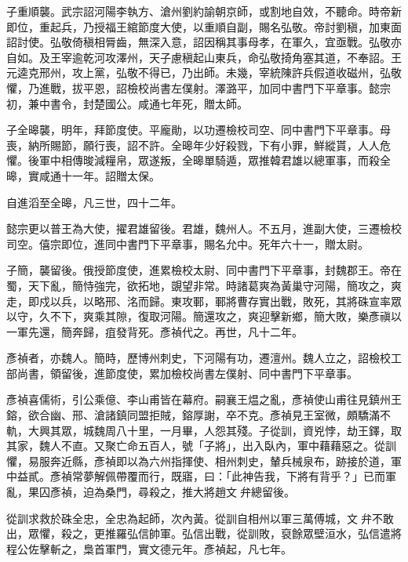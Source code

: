 \begin{pinyinscope}
 子重順襲。武宗詔河陽李執方、滄州劉約諭朝京師，或割地自效，不聽命。時帝新即位，重起兵，乃授福王綰節度大使，以重順自副，賜名弘敬。帝討劉稹，加東面詔討使。弘敬倚稹相脣齒，無深入意，詔因稱其事母孝，在軍久，宜亟戰。弘敬亦自如。及王宰逾乾河攻澤州，天子慮稹起山東兵，命弘敬掎角塞其道，不奉詔。王元逵克邢州，攻上黨，弘敬不得已，乃出師。未幾，宰統陳許兵假道收磁州，弘敬懼，乃進戰，拔平恩，詔檢校尚書左僕射。澤潞平，加同中書門下平章事。懿宗初，兼中書令，封楚國公。咸通七年死，贈太師。



 子全暤襲，明年，拜節度使。平龐勛，以功遷檢校司空、同中書門下平章事。母喪，納所賜節，願行喪，詔不許。全暤年少好殺戮，下有小罪，鮮縱貰，人人危懼。後軍中相傳晙減糧帛，眾遂叛，全暤單騎遁，眾推韓君雄以總軍事，而殺全暤，實咸通十一年。詔贈太保。



 自進滔至全暤，凡三世，四十二年。



 懿宗更以普王為大使，擢君雄留後。君雄，魏州人。不五月，進副大使，三遷檢校司空。僖宗即位，進同中書門下平章事，賜名允中。死年六十一，贈太尉。



 子簡，襲留後。俄授節度使，進累檢校太尉、同中書門下平章事，封魏郡王。帝在蜀，天下亂，簡恃強完，欲拓地，覬望非常。時諸葛爽為黃巢守河陽，簡攻之，爽走，即戍以兵，以略邢、洺而歸。東攻鄆，鄆將曹存實出戰，敗死，其將硃宣率眾以守，久不下，爽乘其隙，復取河陽。簡還攻之，爽迎擊新鄉，簡大敗，樂彥禛以一軍先還，簡奔歸，疽發背死。彥禎代之。再世，凡十二年。



 彥禎者，亦魏人。簡時，歷博州刺史，下河陽有功，遷澶州。魏人立之，詔檢校工部尚書，領留後，進節度使，累加檢校尚書左僕射、同中書門下平章事。



 彥禎喜儒術，引公乘億、李山甫皆在幕府。嗣襄王煴之亂，彥禎使山甫往見鎮州王鎔，欲合幽、邢、滄諸鎮同盟拒賊，鎔厚謝，卒不克。彥禎見王室微，頗驕滿不軌，大興其眾，城魏周八十里，一月畢，人怨其殘。子從訓，資兇悖，劫王鐸，取其家，魏人不直。又聚亡命五百人，號「子將」，出入臥內，軍中藉藉惡之。從訓懼，易服奔近縣，彥禎即以為六州指揮使、相州刺史，輦兵械泉布，跡接於道，軍中益貳。彥禎常夢解佩帶覆而行，既寤，曰：「此神告我，下將有背乎？」已而軍亂，果囚彥禎，迫為桑門，尋殺之，推大將趙文弁總留後。



 從訓求救於硃全忠，全忠為起師，次內黃。從訓自相州以軍三萬傅城，文弁不敢出，眾懼，殺之，更推羅弘信帥軍。弘信出戰，從訓敗，裒餘眾壁洹水，弘信遣將程公佐擊斬之，梟首軍門，實文德元年。彥禎起，凡七年。




\end{pinyinscope}
